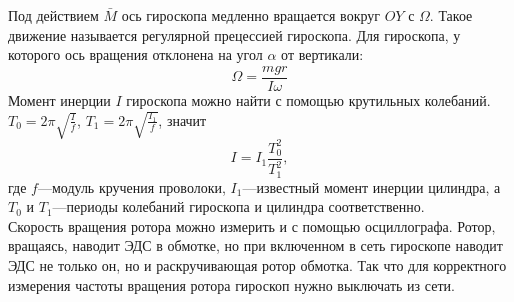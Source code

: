 \documentclass[a4paper, 12pt]{article}
\begin{document}
Под действием $\bar{M}$ ось гироскопа медленно вращается вокруг $OY$ с $\Omega$. Такое движение называется регулярной прецессией гироскопа.
Для гироскопа, у которого ось вращения отклонена на угол $\alpha$ от вертикали:
\begin{equation}
    \Omega=\frac{mgr}{I\omega}
    \label{e5}
\end{equation}
Момент инерции $I$ гироскопа можно найти с помощью крутильных колебаний.
$T_0=2\pi\sqrt{\frac{I}{f}}$, $T_1=2\pi\sqrt{\frac{I_1}{f}}$, значит
\begin{equation}
    \label{e6}
    I=I_1\frac{T_0^2}{T_1^2},
\end{equation}
где $f$---модуль кручения проволоки, $I_1$---известный момент инерции цилиндра, а $T_0$ и $T_1$---периоды колебаний гироскопа и цилиндра соответственно.\\
Скорость вращения ротора можно измерить и с помощью осциллографа. Ротор, вращаясь, наводит ЭДС в обмотке, но при включенном в сеть гироскопе наводит ЭДС не только он, но и раскручивающая ротор обмотка. Так что для корректного измерения частоты вращения ротора гироскоп нужно выключать из сети.
\end{document}
